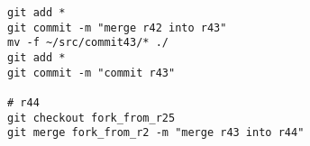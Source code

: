 
\tiny
\begin{verbatim}
git add *
git commit -m "merge r42 into r43"
mv -f ~/src/commit43/* ./
git add *
git commit -m "commit r43"

# r44
git checkout fork_from_r25
git merge fork_from_r2 -m "merge r43 into r44"

\end{verbatim}
\normalsize